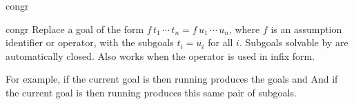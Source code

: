 \begin{tactic}{congr}
  \begin{tsyntax}[empty]{congr}
    Replace a goal of the form
    $f\,t_1\,\cdots\,t_n = f\,u_1\,\cdots\,u_n$, where $f$ is an
    assumption identifier or operator, with the subgoals $t_i = u_i$
    for all $i$.  Subgoals solvable by  are
    automatically closed. Also works when the operator is used in
    infix form.

  For example, if the current goal is
   then
  running 
  produces the goals
  and
  And if the current goal is
   then
  running 
  produces this same pair of subgoals.
  \end{tsyntax}
\end{tactic}
